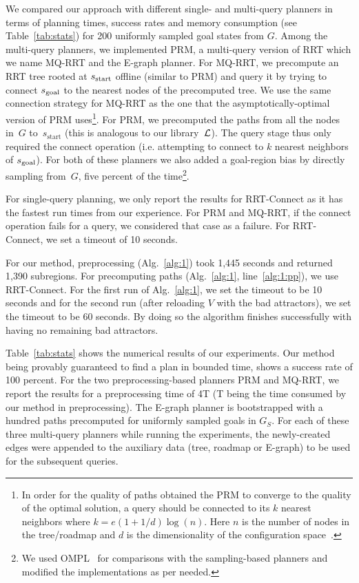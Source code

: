 \documentclass[a4paper]{report}
\begin{document}
We compared our approach with different single- and multi-query planners in terms of planning times, success rates and memory consumption (see Table~\ref{tab:stats}) for 200 uniformly sampled goal states from $G$. Among the multi-query planners, we implemented PRM, a multi-query version of RRT which we name MQ-RRT and the E-graph planner. 
For MQ-RRT, we precompute an RRT tree rooted at  $s_{\textrm{start}}$ offline (similar to PRM) and query it by trying to connect $s_{\text{goal}}$ to the nearest nodes of the precomputed tree. We use the same connection strategy for MQ-RRT as the one that the asymptotically-optimal version of PRM uses\footnote{In order for the quality of paths obtained the PRM to converge to the quality of the optimal solution, a query should be connected to its $k$ nearest neighbors where 
$k = e(1+1/d)\log(n)$.
Here $n$ is the number of nodes in the tree/roadmap and $d$ is the dimensionality of the configuration space~\cite{karaman2011sampling,SSH16}. 
}.
For PRM, we precomputed the paths from all the nodes in~$G$ to~$s_{\text{start}}$ (this is analogous to our library~$\mathcal{L}$). 
The query stage thus only required the connect operation (i.e. attempting to connect to $k$ nearest neighbors of $s_{\text{goal}}$). For both of these planners we also added a goal-region bias by directly sampling from~$G$, five percent of the time\footnote{We used OMPL~\cite{SMK12} for comparisons with the sampling-based planners and modified the implementations as per needed.}. 

For single-query planning, we only report the results for RRT-Connect as it has the fastest run times from our experience. For PRM and MQ-RRT, if the connect operation fails for a query, we considered that case as a failure. For RRT-Connect, we set a timeout of 10 seconds.

For our method, preprocessing (Alg.~\ref{alg:1}) took 1,445 seconds and returned 1,390 subregions. For precomputing paths (Alg.~\ref{alg:1}, line~\ref{alg:1:pp}), we use RRT-Connect. For the first run of Alg.~\ref{alg:1}, we set the timeout to be 10 seconds and for the second run (after reloading $V$ with the bad attractors), we set the timeout to be 60 seconds. By doing so the algorithm finishes successfully with having no remaining bad attractors.

Table~\ref{tab:stats} shows the numerical results of our experiments. Our method being provably guaranteed to find a plan in bounded time, shows a success rate of 100 percent. For the two preprocessing-based planners PRM and MQ-RRT, we report the results for a preprocessing time of 4T (T being the time consumed by our method in preprocessing). The E-graph planner is bootstrapped with a hundred paths precomputed for uniformly sampled goals in $G_S$. For each of these three multi-query planners while running the experiments, the newly-created edges were appended to the auxiliary data (tree, roadmap or E-graph) to be used for the subsequent queries.
\end{document}
